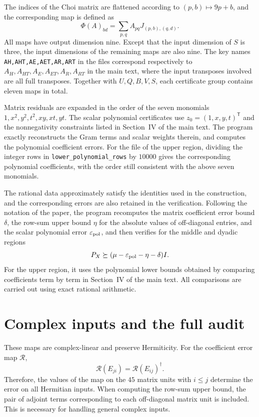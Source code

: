 \documentclass[aps,pra,onecolumn,notitlepage,10pt,amsmath,amssymb,nofootinbib]{revtex4-1}
\begin{document}
The indices of the Choi matrix are flattened according to \((p,b)\mapsto9p+b\), and the corresponding map is defined as
\begin{equation}
 \Phi(A)_{bd}=\sum_{p,q}A_{pq}J_{(p,b),(q,d)}.
\end{equation}
All maps have output dimension nine. Except that the input dimension of \(S\) is three, the input dimensions of the remaining maps are also nine. The key names \texttt{AH,AHT,AE,AET,AR,ART} in the files correspond respectively to \(A_H,A_{HT},A_E,A_{ET},A_R,A_{RT}\) in the main text, where the input transposes involved are all full transposes. Together with \(U,Q,B,V,S\), each certificate group contains eleven maps in total.

Matrix residuals are expanded in the order of the seven monomials \(1,x^2,y^2,t^2,xy,xt,yt\). The scalar polynomial certificates use \(z_0=(1,x,y,t)^{\mathsf T}\) and the nonnegativity constraints listed in Section~IV of the main text. The program exactly reconstructs the Gram terms and scalar weights therein, and computes the polynomial coefficient errors. For the file of the upper region, dividing the integer rows in \texttt{lower\_polynomial\_rows} by \(10000\) gives the corresponding polynomial coefficients, with the order still consistent with the above seven monomials.

The rational data approximately satisfy the identities used in the construction, and the corresponding errors are also retained in the verification. Following the notation of the paper, the program recomputes the matrix coefficient error bound \(\delta\), the row-sum upper bound \(\eta\) for the absolute values of off-diagonal entries, and the scalar polynomial error \(\varepsilon_{\rm pol}\), and then verifies for the middle and dyadic regions
\begin{equation}
 P_X\succeq(\mu-\varepsilon_{\rm pol}-\eta-\delta)I.
\end{equation}
For the upper region, it uses the polynomial lower bounds obtained by comparing coefficients term by term in Section~IV of the main text. All comparisons are carried out using exact rational arithmetic.



\section{Complex inputs and the full audit}

These maps are complex-linear and preserve Hermiticity. For the coefficient error map $\mathcal R$,
\begin{equation}
 \mathcal R(E_{ji})=\mathcal R(E_{ij})^\dagger.
\end{equation}
Therefore, the values of the map on the $45$ matrix units with $i\le j$ determine the error on all Hermitian inputs. When computing the row-sum upper bound, the pair of adjoint terms corresponding to each off-diagonal matrix unit is included. This is necessary for handling general complex inputs.
\end{document}
